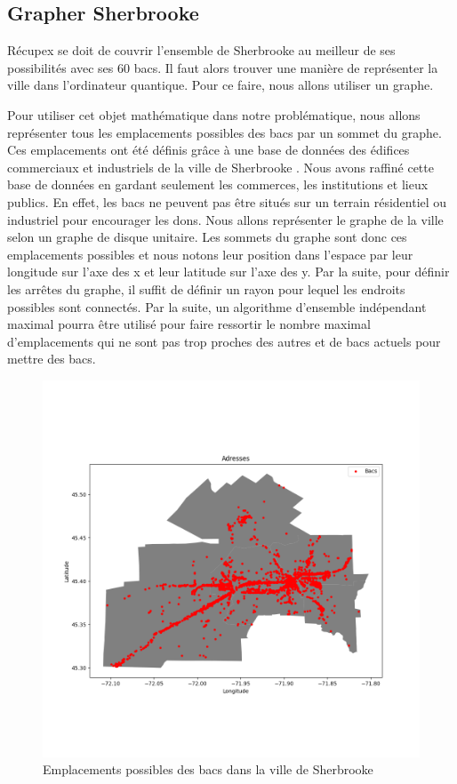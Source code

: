 \documentclass[11pt]{article}
\begin{document}
\subsection{Grapher Sherbrooke}
Récupex se doit de couvrir l'ensemble de Sherbrooke au meilleur de ses possibilités avec ses 60 bacs. Il faut alors trouver une manière de représenter la ville dans l'ordinateur quantique. Pour ce faire, nous allons utiliser un graphe. 

Pour utiliser cet objet mathématique dans notre problématique, nous allons représenter tous les emplacements possibles des bacs par un sommet du graphe. Ces emplacements ont été définis grâce à une base de données des édifices commerciaux et industriels de la ville de Sherbrooke \cite{noauthor_repertoire_nodate}. Nous avons raffiné cette base de données en gardant seulement les commerces, les institutions et lieux publics. En effet, les bacs ne peuvent pas être situés sur un terrain résidentiel ou industriel pour encourager les dons. Nous allons représenter le graphe de la ville selon un graphe de disque unitaire. Les sommets du graphe sont donc ces emplacements possibles et nous notons leur position dans l'espace par leur longitude sur l'axe des x et leur latitude sur l'axe des y. Par la suite, pour définir les arrêtes du graphe, il suffit de définir un rayon pour  lequel les endroits possibles sont connectés. Par la suite, un algorithme d'ensemble indépendant maximal pourra être utilisé pour faire ressortir le nombre maximal d'emplacements qui ne sont pas trop proches des autres et de bacs actuels pour mettre des bacs.


 \begin{figure}[H]
    \centering
        \includegraphics[width=0.5\linewidth]{images/commerces.png}
        \caption{Emplacements possibles des bacs dans la ville de Sherbrooke}
    \label{bacs_possibles_total}
\end{figure}
\end{document}
